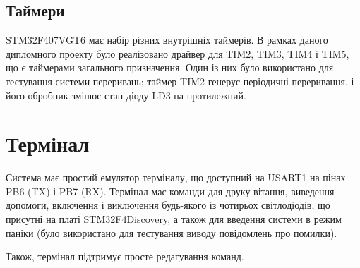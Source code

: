 \documentclass[oneside,14pt,a4paper,final]{myextreport}
\begin{document}
\subsection{Таймери}

STM32F407VGT6 має набір різних внутрішніх таймерів. В рамках даного дипломного проекту було реалізовано драйвер для TIM2, TIM3, TIM4 і TIM5, що є таймерами загального призначення. Один із них було використано для тестування системи переривань; таймер TIM2 генерує періодичні переривання, і його обробник змінює стан діоду LD3 на протилежний.

\section{Термінал}

Система має простий емулятор терміналу, що доступний на USART1 на пінах PB6 (TX) і PB7 (RX). Термінал має команди для друку вітання, виведення допомоги, включення і виключення будь-якого із чотирьох світлодіодів, що присутні на платі STM32F4Discovery, а також для введення системи в режим паніки (було використано для тестування виводу повідомлень про помилки).

Також, термінал підтримує просте редагування команд.

\end{document}
